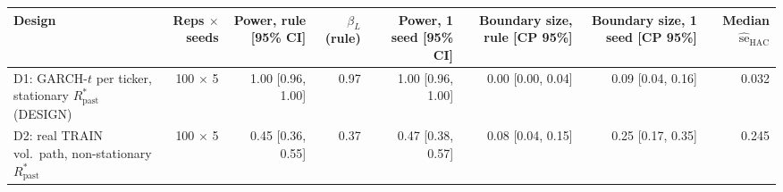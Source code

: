 \begin{tabular}{lrrrrrrr}
\toprule
Design & Reps $\times$ seeds & Power, rule [95\% CI] & $\beta_L$ (rule) & Power, 1 seed [95\% CI] & Boundary size, rule [CP 95\%] & Boundary size, 1 seed [CP 95\%] & Median $\widehat{\mathrm{se}}_{\mathrm{HAC}}$ \\
\midrule
D1: GARCH-$t$ per ticker, stationary $R_{\mathrm{past}}^*$ (DESIGN) & 100 $\times$ 5 & 1.00 [0.96, 1.00] & 0.97 & 1.00 [0.96, 1.00] & 0.00 [0.00, 0.04] & 0.09 [0.04, 0.16] & 0.032 \\
D2: real TRAIN vol.\ path, non-stationary $R_{\mathrm{past}}^*$ & 100 $\times$ 5 & 0.45 [0.36, 0.55] & 0.37 & 0.47 [0.38, 0.57] & 0.08 [0.04, 0.15] & 0.25 [0.17, 0.35] & 0.245 \\
\bottomrule
\end{tabular}
